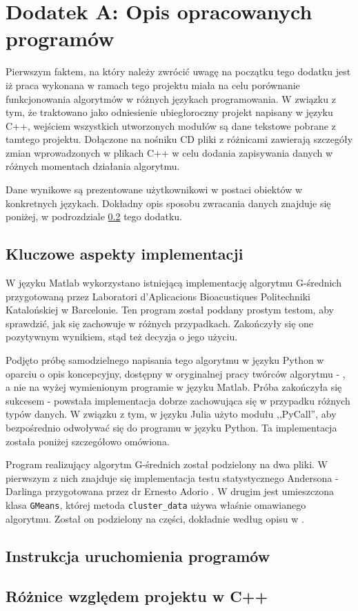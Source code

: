 \section*{Dodatek A: Opis opracowanych programów}

\qquad Pierwszym faktem, na który należy zwrócić uwagę na początku tego dodatku jest iż praca wykonana w ramach tego projektu miała na celu porównanie funkcjonowania algorytmów w różnych językach programowania. W związku z tym, że traktowano jako odniesienie ubiegłoroczny projekt napisany w języku C++, wejściem wszystkich utworzonych modułów są dane tekstowe pobrane z tamtego projektu. Dołączone na nośniku CD pliki z różnicami zawierają szczegóły zmian wprowadzonych w plikach C++ w celu dodania zapisywania danych w różnych momentach działania algorytmu.

Dane wynikowe są prezentowane użytkownikowi w postaci obiektów w konkretnych językach. Dokładny opis sposobu zwracania danych znajduje się poniżej, w podrozdziale \ref{sub:instrukcja} tego dodatku.

\subsection{Kluczowe aspekty implementacji}

\qquad W języku Matlab wykorzystano istniejącą implementację algorytmu G-średnich przygotowaną przez Laboratori d'Aplicacions Bioacustiques Politechniki Katalońskiej w Barcelonie. Ten program został poddany prostym testom, aby sprawdzić, jak się zachowuje w różnych przypadkach. Zakończyły się one pozytywnym wynikiem, stąd też decyzja o jego użyciu.

Podjęto próbę samodzielnego napisania tego algorytmu w języku Python w oparciu o opis koncepcyjny, dostępny w oryginalnej pracy twórców algorytmu - \cite{GMeans}, a nie na wyżej wymienionym programie w języku Matlab. Próba zakończyła się sukcesem - powstała implementacja dobrze zachowująca się w przypadku różnych typów danych. W związku z tym, w języku Julia użyto modułu ,,PyCall'', aby bezpośrednio odwoływać się do programu w języku Python. Ta implementacja została poniżej szczegółowo omówiona.

Program realizujący algorytm G-średnich został podzielony na dwa pliki. W pierwszym z nich znajduje się implementacja testu statystycznego Andersona - Darlinga przygotowana przez dr Ernesto Adorio \cite{ad-test-python}. W drugim jest umieszczona klasa \texttt{GMeans}, której metoda \texttt{cluster\_data} używa właśnie omawianego algorytmu. Został on podzielony na części, dokładnie według opisu w \cite{GMeans}.

\subsection{Instrukcja uruchomienia programów}
\label{sub:instrukcja}

\subsection{Różnice względem projektu w C++}

